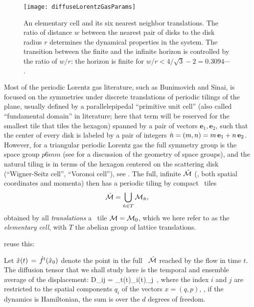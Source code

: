 

\begin{figure}[htbp]
	\begin{center}
    \texttt{[image: diffuseLorentzGasParams]}
	\end{center}
	\caption[]{\label{fig-LorentzGasParams}
    An elementary cell and its six nearest neighbor translations. The ratio of
    distance $w$ between the nearest pair of disks to the disk radius $r$
    determines the dynamical properties in the system. The transition
    between the finite and the infinite horizon is controlled by the
    ratio of $w/r$: the horizon is finite for $w/r < 4/\sqrt{3}-2
    =0.3094\cdots$.
	}
\end{figure}

Most of the periodic Lorentz gas literature, such as Bunimovich and
Sinai, is focused on the symmetries under discrete
translations of periodic tilings of the plane, usually defined by a
parallelepipedal ``primitive unit cell''
(also called ``fundamental domain'' in literature; here that term will
be reserved for the smallest tile that tiles the hexagon)
spanned by a pair of vectors
$\textbf{e}_1,\textbf{e}_2$, such that the center of every disk is
labeled by a pair of integers
$\hat{n}=(m,n)=m\,\textbf{e}_1+n\,\textbf{e}_2$.
However, for a triangular periodic Lorentz gas the full symmetry group is
the space group $p6mm$ (see  for a discussion of the
geometry of space groups), and the natural tiling is in terms of the
hexagon centered on the scattering disk (``Wigner-Seitz cell'', ``Voronoi
cell''),  see .
The full, infinite {\statesp} $\hat {{\cal M}}$ (\ie, both spatial coordinates and
momenta) then has a periodic tiling by compact \statesp\ tiles
\[ %
\hM=\bigcup_{ \hn \in T} \pS_{\hn},
\] %
obtained by all {\em translations} a \statesp\ tile ${\cal M}={\cal M}_{0}$, which
we here refer to as the {\em elementary cell}, with $T$ the abelian group
of lattice translations.

     {
reuse this:

Let $\hat x(t)\,=\,{\hat{f}^{t}(\hat x_0)}$ denote the point in the full
\statesp\ $\hat {{\cal M}}$ reached by the flow in time $t$. The diffusion tensor
that we shall study here
is the temporal and ensemble average of the displacement: \beq D_{ij}
=
\lim_{t\to\infty}\left\langle\hx(t)_i\hx(t)_j\right\rangle
 \,, \label{eq-diff-def} \eeq where the index $i$ and $j$ are
restricted to the spatial components $q_i$ of the {\statesp} vectors
$x=(q,p)$, \ie, if the dynamics is Hamiltonian, the sum is over the
$d$ degrees of freedom.
    }


